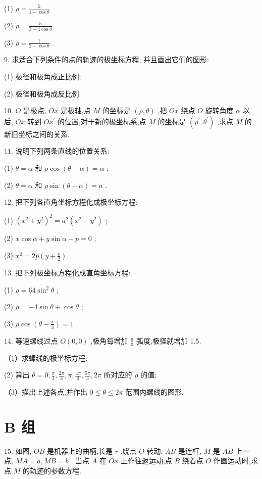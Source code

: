 \documentclass[lang=cn,newtx,10pt,scheme=chinese]{elegantbook}
\begin{document}
(1) \(\rho = \frac{5}{1 - \cos \theta }\)

(2) \(\rho = \frac{5}{3 - 4\cos \theta }\)

(3) \(\rho = \frac{1}{2 - \cos \theta }\) .

9. 求适合下列条件的点的轨迹的极坐标方程, 并且画出它们的图形:

(1) 极径和极角成正比例;

(2) 极径和极角成反比例.

10. \(O\) 是极点, \({Ox}\) 是极轴,点 \(M\) 的坐标是 \(\left( {\rho ,\theta }\right)\) ,把 \({Ox}\) 绕点 \(O\) 旋转角度 \(\alpha\) 以后, \({Ox}\) 转到 \(O{x}^{\prime }\) 的位置,对于新的极坐标系,点 \(M\) 的坐标是 \(\left( {{\rho }^{\prime },{\theta }^{\prime }}\right)\) ,求点 \(M\) 的新旧坐标之间的关系.

11. 说明下列两条直线的位置关系:

(1) \(\theta = \alpha\) 和 \(\rho \cos \left( {\theta - \alpha }\right) = \alpha\) ;

(2) \(\theta = \alpha\) 和 \(\rho \sin \left( {\theta - \alpha }\right) = a\) .

12. 把下列各直角坐标方程化成极坐标方程:

(1) \({\left( {x}^{2} + {y}^{2}\right) }^{2} = {a}^{2}\left( {{x}^{2} - {y}^{2}}\right)\) ;

(2) \(x\cos \alpha + y\sin \alpha - p = 0\) ;

(3) \({x}^{2} = {2p}\left( {y + \frac{p}{2}}\right)\) .

13. 把下列极坐标方程化成直角坐标方程:

(1) \(\rho = {64}{\sin }^{2}\theta\) ;

(2) \(\rho = - 4\sin \theta + \cos \theta\) ;

(3) \(\rho \cos \left( {\theta - \frac{\pi }{3}}\right) = 1\) .

14. 等速螺线过点 \(O\left( {0,0}\right)\) ,极角每增加 \(\frac{\pi }{3}\) 弧度,极径就增加 1.5.

（1）求螺线的极坐标方程;

(2) 算出 \(\theta = 0,\frac{\pi }{3},\frac{2\pi }{3},\pi ,\frac{4\pi }{3},\frac{5\pi }{3},{2\pi }\) 所对应的 \(\rho\) 的值;

（3）描出上述各点,并作出 \(0 \leq \theta \leq {2\pi }\) 范围内螺线的图形.

\section*{B 组}

15. 如图, \({OB}\) 是机器上的曲柄,长是 \(r\) ,绕点 \(O\) 转动, \({AB}\) 是连杆, \(M\) 是 \({AB}\) 上一点, \({MA} = a,{MB} = b\) . 当点 \(A\) 在 \({Ox}\) 上作往返运动,点 \(B\) 绕着点 \(O\) 作圆运动时,求点 \(M\) 的轨迹的参数方程.
\end{document}
